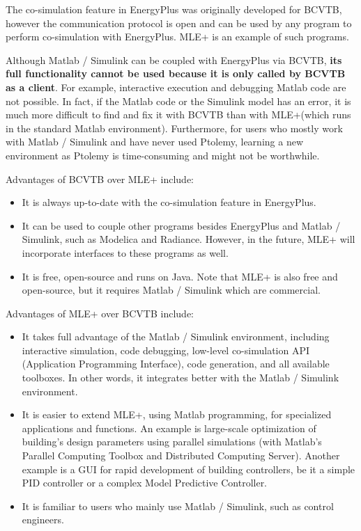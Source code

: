 \documentclass[11pt,letter]{article}
\newcommand{\MLEP}{MLE+\xspace}
\begin{document}
The co-simulation feature in EnergyPlus was originally developed for
BCVTB, however the communication protocol is open and can be used by
any program to perform co-simulation with EnergyPlus.  \MLEP is an
example of such programs.

Although Matlab / Simulink can be coupled with EnergyPlus via BCVTB, \textbf{its
full functionality cannot be used because it is only called by BCVTB
as a client}.
For example, interactive execution and debugging Matlab code are not
possible.
In fact, if the Matlab code or the Simulink model has an error, it is much more difficult to find and fix it with BCVTB than with \MLEP (which runs in the standard Matlab environment).
Furthermore, for users who mostly work with Matlab / Simulink and have never used Ptolemy, learning a new environment as Ptolemy is time-consuming and might not be worthwhile.

Advantages of BCVTB over \MLEP include:
\begin{itemize}
\item It is always up-to-date with the co-simulation feature in EnergyPlus.
\item It can be used to couple other programs besides EnergyPlus and
  Matlab / Simulink, such as Modelica and Radiance.  However, in the future, \MLEP will incorporate interfaces to these programs as well.
\item It is free, open-source and runs on Java.  Note that \MLEP is also
  free and open-source, but it requires Matlab / Simulink which are
  commercial.
\end{itemize}

Advantages of \MLEP over BCVTB include:
\begin{itemize}
\item It takes full advantage of the Matlab / Simulink environment,
  including interactive simulation, code debugging, low-level
  co-simulation API (Application Programming Interface), code
  generation, and all available toolboxes.  In other words, it
  integrates better with the Matlab / Simulink environment.
\item It is easier to extend \MLEP, using Matlab programming, for specialized
  applications and functions.  An example is large-scale optimization
  of building's design parameters using parallel simulations (with
  Matlab's Parallel Computing Toolbox and Distributed Computing
  Server).  Another example is a GUI for rapid development of building
  controllers, be it a simple PID controller or a complex Model
  Predictive Controller.
\item It is familiar to users who mainly use Matlab / Simulink, such as control engineers.
\end{itemize}
\end{document}
